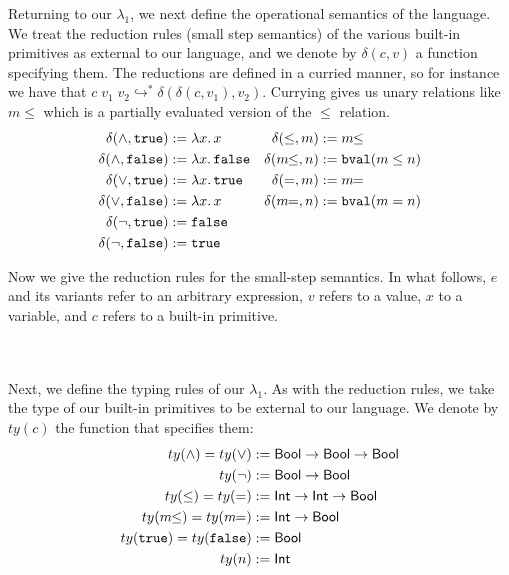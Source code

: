 \documentclass[11pt]{article}
\newcommand{\col}{\mathbin{:}}       %
\newcommand{\step}{\hookrightarrow}
\newcommand{\many}{\hookrightarrow^*}
\newcommand{\true}{\mathtt{true}}
\newcommand{\Int}{{\sf Int}}
\newcommand{\Bool}{{\sf Bool}}
\newcommand{\letin}[3]{{\tt let}\,#1=#2\,{\tt in}\,#3}
\begin{document}
Returning to our $\lambda_1$, we next define the operational semantics of the language. We treat the reduction rules (small step semantics) of the various built-in primitives as external to our language, and we denote by $\delta(c,v)$ a function specifying them. The reductions are defined in a curried manner, so for instance we have that 
$c\; v_1\; v_2 \many \delta(\delta(c,v_1),v_2)$. Currying gives us unary relations like $m\!\!\leq$ which is a partially evaluated version of the $\leq$ relation.
\begin{align*}
\delta(\wedge,\true) &:= \lambda x.\, x &
  \delta(\leq,m) &:= m\!\!\leq \\
\delta(\wedge,{\tt false}) &:= \lambda x.\, {\tt false} &
  \delta(m\!\!\leq, n) &:= {\tt bval}(m \leq n)\\
\delta(\vee,\true) &:= \lambda x.\, \true &
  \delta(=,m) &:= m\!\!= \\
\delta(\vee,{\tt false}) &:= \lambda x.\, x &
  \delta(m\!\!=, n) &:= {\tt bval}(m = n) \\ 
\delta(\neg,\true) &:= {\tt false}\\
\delta(\neg,{\tt false}) &:= \true \\
\end{align*}

Now we give the reduction rules for the small-step semantics. In what follows, $e$ and its variants refer to an arbitrary expression, $v$ refers to a value, $x$ to a variable, and $c$  refers to a built-in primitive.\\ \\ \\


Next, we define the typing rules of our $\lambda_1$.
As with the reduction rules, we take the type of our built-in primitives to be external to our language. We denote by $ty(c)$ the function that specifies them: 
\begin{align*}
ty(\wedge) = ty(\vee) :=&\; 	\Bool \rightarrow \Bool \rightarrow \Bool\\
ty(\neg) :=&\; \Bool \rightarrow \Bool\\
ty(\leq) = ty(=) :=&\; \Int \rightarrow \Int \rightarrow \Bool\\
ty(m\!\!\leq) = ty(m\!\!=) :=&\; \Int \rightarrow \Bool \\
ty(\true) = ty({\tt false}) :=&\; \Bool\\
ty(n) :=&\; \Int 
\end{align*}
\end{document}
